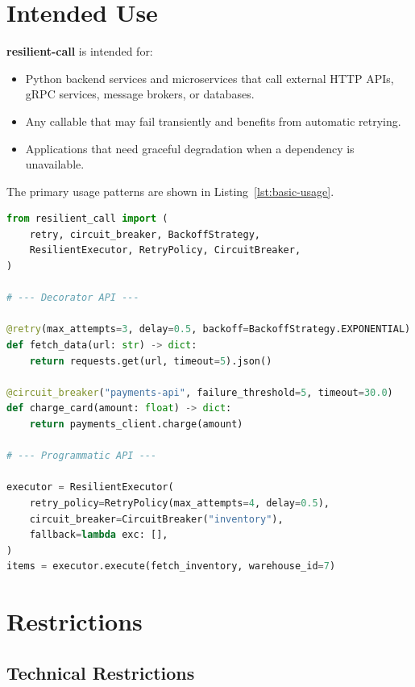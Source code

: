 \section{Intended Use}
\label{sec:intended-use}

\textbf{resilient-call} is intended for:

\begin{itemize}[leftmargin=*, label=\textbullet]
    \item Python backend services and microservices that call external HTTP
          APIs, gRPC services, message brokers, or databases.
    \item Any callable that may fail transiently and benefits from
          automatic retrying.
    \item Applications that need graceful degradation when a dependency is
          unavailable.
\end{itemize}

The primary usage patterns are shown in Listing~\ref{lst:basic-usage}.

\begin{lstlisting}[language=Python, caption={Basic usage — decorator and programmatic API}, label={lst:basic-usage}]
from resilient_call import (
    retry, circuit_breaker, BackoffStrategy,
    ResilientExecutor, RetryPolicy, CircuitBreaker,
)

# --- Decorator API ---

@retry(max_attempts=3, delay=0.5, backoff=BackoffStrategy.EXPONENTIAL)
def fetch_data(url: str) -> dict:
    return requests.get(url, timeout=5).json()

@circuit_breaker("payments-api", failure_threshold=5, timeout=30.0)
def charge_card(amount: float) -> dict:
    return payments_client.charge(amount)

# --- Programmatic API ---

executor = ResilientExecutor(
    retry_policy=RetryPolicy(max_attempts=4, delay=0.5),
    circuit_breaker=CircuitBreaker("inventory"),
    fallback=lambda exc: [],
)
items = executor.execute(fetch_inventory, warehouse_id=7)
\end{lstlisting}

\section{Restrictions}
\label{sec:restrictions}

\subsection{Technical Restrictions}

